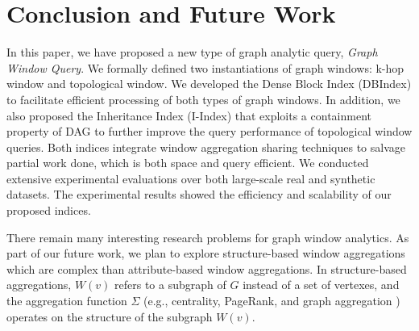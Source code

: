 \section{Conclusion and Future Work}
In this paper, we have proposed a new type of graph analytic query,  \emph{Graph Window Query}. We formally defined two instantiations of graph windows: k-hop window and topological window.
We developed the Dense Block Index (DBIndex) to facilitate efficient processing of both types of graph windows. In addition, we also proposed the Inheritance Index (I-Index) that exploits a containment property of DAG to further improve the query performance of topological window queries. Both indices integrate window aggregation sharing techniques to salvage partial work done, which is both space and query efficient. We conducted extensive experimental evaluations over both large-scale real and synthetic datasets. The experimental results showed the efficiency and scalability of our proposed indices. 


There remain many interesting research problems for graph window analytics. 
As part of our future work, we plan to explore structure-based window aggregations
which are complex than attribute-based window aggregations.
In structure-based aggregations, $W(v)$ refers to a subgraph of $G$ instead of a set of vertexes,
and the aggregation function $\Sigma$ (e.g., centrality, PageRank, and {graph aggregation} \cite{wang2014pagrol,zhao2011graph}) operates on the structure of the subgraph $W(v)$. 
